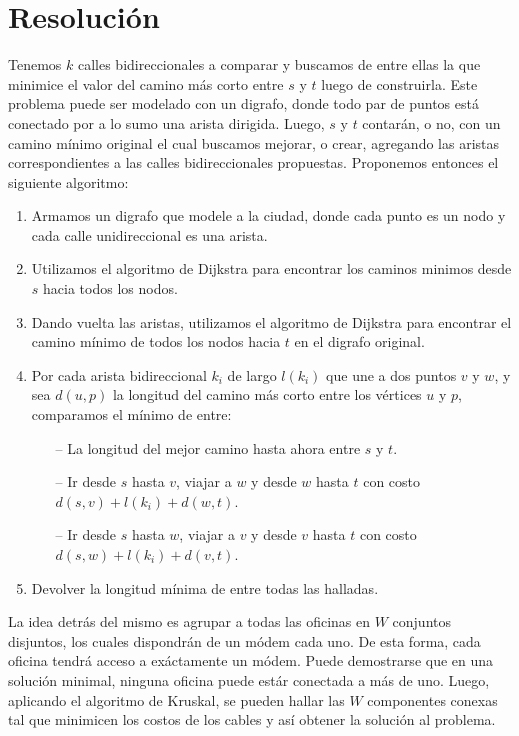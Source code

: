 \section{Resolución}

Tenemos $k$ calles bidireccionales a comparar y buscamos de entre ellas la que minimice el valor del camino más corto entre $s$ y $t$ luego de construirla. Este problema puede ser modelado con un digrafo, donde todo par de puntos está conectado por a lo sumo una arista dirigida. Luego, $s$ y $t$ contarán, o no, con un camino mínimo original el cual buscamos mejorar, o crear, agregando las aristas correspondientes a las calles bidireccionales propuestas. Proponemos entonces el siguiente algoritmo:

\begin{enumerate}
    \item Armamos un digrafo que modele a la ciudad, donde cada punto es un nodo y cada calle unidireccional es una arista. 
    \item Utilizamos el algoritmo de Dijkstra para encontrar los caminos minimos desde $s$ hacia todos los nodos.
    \item Dando vuelta las aristas, utilizamos el algoritmo de Dijkstra para encontrar el camino mínimo de todos los nodos hacia $t$ en el digrafo original.
    \item Por cada arista bidireccional $k_i$ de largo $l(k_i)$ que une a dos puntos $v$ y $w$, y sea $d(u,p)$ la longitud del camino más corto entre los vértices $u$ y $p$, comparamos el mínimo de entre: 
    \begin{itemize}
        \item[--] La longitud del mejor camino hasta ahora entre $s$ y $t$.
        \item[--] Ir desde $s$ hasta $v$, viajar a $w$ y desde $w$ hasta $t$ con costo $d(s,v) + l(k_i) + d(w,t)$.
        \item[--] Ir desde $s$ hasta $w$, viajar a $v$ y desde $v$ hasta $t$ con costo $d(s,w) + l(k_i) + d(v,t)$.
    \end{itemize}
    \item Devolver la longitud mínima de entre todas las halladas.
\end{enumerate}

La idea detrás del mismo es agrupar a todas las oficinas en $W$ conjuntos disjuntos, los cuales dispondrán de un módem cada uno. De esta forma, cada oficina tendrá acceso a exáctamente un módem. Puede demostrarse que en una solución minimal, ninguna oficina puede estár conectada a más de uno. Luego, aplicando el algoritmo de Kruskal, se pueden hallar las $W$ componentes conexas tal que minimicen los costos de los cables y así obtener la solución al problema. 

